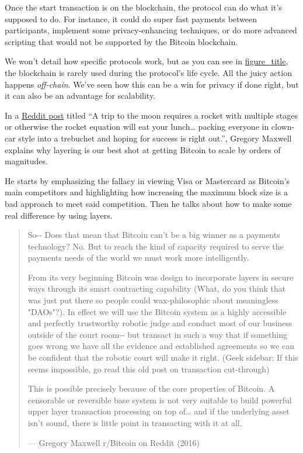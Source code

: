 Once the start transaction is on the blockchain, the protocol can do
what it's supposed to do. For instance, it could do super fast payments
between participants, implement some privacy-enhancing techniques, or do
more advanced scripting that would not be supported by the Bitcoin
blockchain.

We won't detail how specific protocols work, but as you can see in
\protect\hyperlink{fig-scaling-layer}{figure\_title}, the blockchain is
rarely used during the protocol's life cycle. All the juicy action
happens \emph{off-chain}. We've seen how this can be a win for privacy
if done right, but it can also be an advantage for scalability.

In a
\href{https://www.reddit.com/r/Bitcoin/comments/438hx0/a_trip_to_the_moon_requires_a_rocket_with/}{Reddit
post} titled ``A trip to the moon requires a rocket with multiple stages
or otherwise the rocket equation will eat your lunch\ldots\hspace{0pt}
packing everyone in clown-car style into a trebuchet and hoping for
success is right out.'', Gregory Maxwell explains why layering is our
best shot at getting Bitcoin to scale by orders of magnitudes.

He starts by emphasizing the fallacy in viewing Visa or Mastercard as
Bitcoin's main competitors and highlighting how increasing the maximum
block size is a bad approach to meet said competition. Then he talks
about how to make some real difference by using layers.

\begin{quote}
So-\/- Does that mean that Bitcoin can't be a big winner as a payments
technology? No. But to reach the kind of capacity required to serve the
payments needs of the world we must work more intelligently.

From its very beginning Bitcoin was design to incorporate layers in
secure ways through its smart contracting capability (What, do you think
that was just put there so people could wax-philosophic about
meaningless "DAOs"?). In effect we will use the Bitcoin system as a
highly accessible and perfectly trustworthy robotic judge and conduct
most of our business outside of the court room-\/- but transact in such
a way that if something goes wrong we have all the evidence and
established agreements so we can be confident that the robotic court
will make it right. (Geek sidebar: If this seems impossible, go read
this old post on transaction cut-through)

This is possible precisely because of the core properties of Bitcoin. A
censorable or reversible base system is not very suitable to build
powerful upper layer transaction processing on top of\ldots\hspace{0pt}
and if the underlying asset isn't sound, there is little point in
transacting with it at all.

---  Gregory Maxwell r/Bitcoin on Reddit (2016)
\end{quote}

